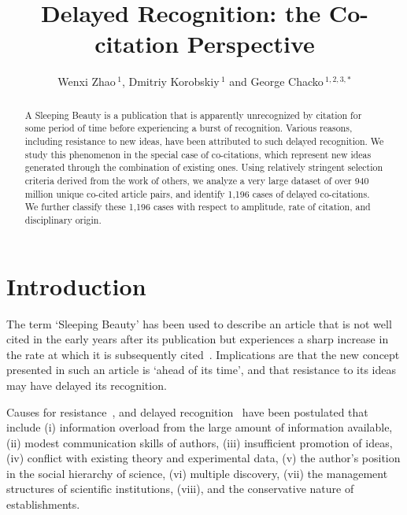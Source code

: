 \documentclass[utf8]{frontiersSCNS}
\def\firstAuthorLast{Zhao {et~al.}} %
\def\Authors{Wenxi Zhao\,$^{1}$, Dmitriy Korobskiy\,$^{1}$  and George Chacko\,$^{1,2,3,*}$}
\begin{document}
\onecolumn
{}

\title[Delayed Co-citations]{Delayed Recognition: the Co-citation Perspective} 

\author[\firstAuthorLast ]{\Authors} %
\address{} %
\correspondance{} %

\extraAuth{}%

\maketitle

\begin{abstract}
A Sleeping Beauty is a publication that is apparently unrecognized by citation for some period of time before experiencing a burst of recognition. Various reasons, including resistance to new ideas, have been attributed to such delayed recognition. We study this phenomenon in the special case of co-citations, which represent new ideas generated through the combination of existing ones. Using relatively stringent selection criteria derived from the work of others, we analyze a very large dataset of over 940 million unique co-cited article pairs, and identify 1,196 cases of delayed co-citations. We further classify these 1,196 cases with respect to amplitude, rate of citation, and disciplinary origin. 

\end{abstract}

\section{Introduction}

The term `Sleeping Beauty' has been used to describe an article that is not well cited in the early years after its publication but experiences a sharp increase in the rate at which it is subsequently cited~\citep{Raan2004}. Implications are that the new concept presented in such an article is `ahead of its time', and that resistance to its ideas may have delayed its recognition.

Causes for resistance~\citep{Barber1961,Cole1970}, and delayed recognition~\citep{Garfield1970a,Garfield1980a} have been postulated  that include (i) information overload from the large amount of information available, (ii)  modest communication skills of authors, (iii) insufficient promotion of ideas, (iv) conflict with existing theory and experimental data, (v) the author's position in the social hierarchy of science, (vi)  multiple discovery, (vii) the management structures of scientific institutions, (viii), and the conservative nature of establishments. 
\end{document}
